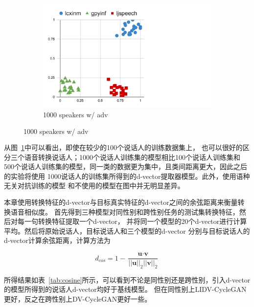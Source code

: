 \begin{figure}[!ht]
\begin{minipage}[b]{0.9\linewidth}
\begin{subfigure}[b]{0.3\linewidth}
            \includegraphics[width=\linewidth,trim=0 0 200 0,clip]{figure/5_dvector23.pdf}
            \caption{1000 speakers w/ adv}
        \end{subfigure}   
    \end{minipage}
    \label{fig:dvectordis}
\end{figure}

从图~\ref{fig:dvectordis}中可以看出，即使在较少的100个说话人的训练数据集上，
也可以很好的区分三个语音转换说话人；1000个说话人训练集的模型相比100个说话人训练集和
500个说话人训练集的模型，同一类的数据更为集中，且类间距离更大，因此之后的实验将使用
1000说话人的训练集所得到的d-vector提取器模型。此外，使用语种无关对抗训练的模型
和不使用的模型在图中并无明显差异。

本章使用转换特征的d-vector与目标真实特征的d-vector之间的余弦距离来衡量转换语音相似度。
首先得到三种模型对同性别和跨性别任务的测试集转换特征，然后对每一句转换特征提取一个d-vector，
并将同一个模型的20个d-vector进行计算平均。然后将原始说话人，目标说话人和三个模型的d-vector
分别与目标说话人的d-vector计算余弦距离，计算方法为

\begin{equation}
    d_{cos} = 1-\frac{\textbf{u} \cdot \textbf{v} }{\left| \left| \textbf{u}\right| \right|_2 \left| \left| \textbf{v}\right| \right|_2}
\end{equation}

所得结果如表~\ref{tab:cosine}所示，可以看到不论是同性别还是跨性别，引入d-vector的模型所得到的说话人d-vector均好于基线模型。
但在同性别上LIDV-CycleGAN更好，反之在跨性别上DV-CycleGAN更好一些。




